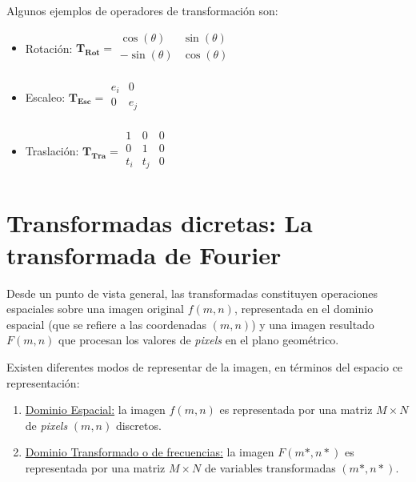 %
Algunos ejemplos de operadores de transformaci\'on son:

\begin{itemize}
 \item Rotaci\'on: $\mathbf{T_{Rot}} = \begin{array}{cc} \cos(\theta) & \sin(\theta)  \\  -\sin(\theta) & \cos(\theta) \\ \end{array}$
 \item Escaleo: $\mathbf{T_{Esc}} = \begin{array}{cc} e_{i} & 0  \\  0 & e_{j} \\ \end{array}$
 \item Traslaci\'on: $\mathbf{T_{Tra}} = \begin{array}{ccc} 1 & 0 & 0 \\  0 & 1 & 0 \\ t_{i} & t_{j} & 0 \\ \end{array}$
\end{itemize}


\section{Transformadas dicretas: La transformada de Fourier}

Desde un punto de vista general, las transformadas constituyen operaciones espaciales sobre una imagen original $f(m, n)$, representada en el dominio
espacial (que se refiere a las coordenadas $(m, n)$) y una imagen resultado $F(m, n)$ que procesan los valores de \textit{pixels} en el plano geom\'etrico.
%

%
Existen diferentes modos de representar de la imagen, en t\'erminos del espacio ce representaci\'on:
\begin{enumerate}
 \item \underline{ Dominio Espacial:} la imagen $f(m, n)$ es representada por una matriz $M \times N$ de \textit{pixels} $(m, n)$ discretos.
 \item \underline{ Dominio Transformado o de frecuencias:} la imagen $F(m*, n*)$ es representada por una matriz $M \times N$ de variables transformadas
 $(m*, n*)$.
\end{enumerate}


